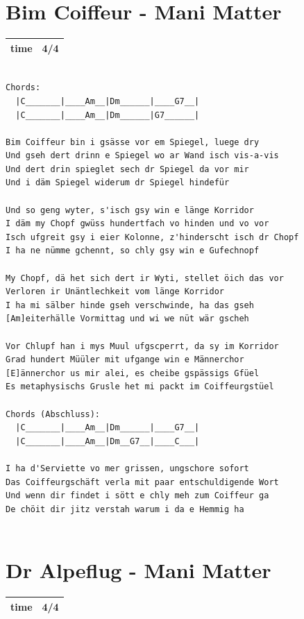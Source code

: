 \documentclass[
]{book}
\let\stdsection\section
\renewcommand\section{\clearpage\stdsection}
\begin{document}
\hypertarget{mundart-und-deutsch-bim-coiffeur}{%
\section{Bim Coiffeur - Mani Matter}\label{mundart-und-deutsch-bim-coiffeur}}

\begin{longtable}[]{@{}ll@{}}
\toprule
\endhead
time & 4/4\tabularnewline
\bottomrule
\end{longtable}

\begin{verbatim}

Chords:
  |C_______|____Am__|Dm______|____G7__|
  |C_______|____Am__|Dm______|G7______|

Bim Coiffeur bin i gsässe vor em Spiegel, luege dry
Und gseh dert drinn e Spiegel wo ar Wand isch vis-a-vis
Und dert drin spieglet sech dr Spiegel da vor mir
Und i däm Spiegel widerum dr Spiegel hindefür

Und so geng wyter, s'isch gsy win e länge Korridor
I däm my Chopf gwüss hundertfach vo hinden und vo vor
Isch ufgreit gsy i eier Kolonne, z'hinderscht isch dr Chopf
I ha ne nümme gchennt, so chly gsy win e Gufechnopf

My Chopf, dä het sich dert ir Wyti, stellet öich das vor
Verloren ir Unäntlechkeit vom länge Korridor
I ha mi sälber hinde gseh verschwinde, ha das gseh
[Am]eiterhälle Vormittag und wi we nüt wär gscheh

Vor Chlupf han i mys Muul ufgscperrt, da sy im Korridor
Grad hundert Müüler mit ufgange win e Männerchor
[E]ännerchor us mir alei, es cheibe gspässigs Gfüel
Es metaphysischs Grusle het mi packt im Coiffeurgstüel

Chords (Abschluss):
  |C_______|____Am__|Dm______|____G7__|
  |C_______|____Am__|Dm__G7__|____C___| 

I ha d'Serviette vo mer grissen, ungschore sofort
Das Coiffeurgschäft verla mit paar entschuldigende Wort
Und wenn dir findet i sött e chly meh zum Coiffeur ga
De chöit dir jitz verstah warum i da e Hemmig ha


\end{verbatim}

\hypertarget{mundart-und-deutsch-dr-alpeflug}{%
\section{Dr Alpeflug - Mani Matter}\label{mundart-und-deutsch-dr-alpeflug}}

\begin{longtable}[]{@{}ll@{}}
\toprule
\endhead
time & 4/4\tabularnewline
\bottomrule
\end{longtable}
\end{document}
